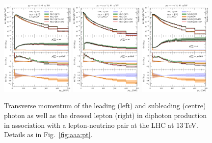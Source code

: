 \begin{figure}[t!]
  \centering
  \includegraphics[width=0.32\textwidth]{figs_aaw/pT_y1}
  \includegraphics[width=0.32\textwidth]{figs_aaw/pT_y2}
  \includegraphics[width=0.32\textwidth]{figs_aaw/pT_l1}
  \caption{
    Transverse momentum of the leading (left) and subleading (centre) 
    photon as well as the dressed lepton (right) in diphoton production 
    in association with a lepton-neutrino pair at the LHC at 13\,TeV. 
    Details as in Fig.\ \ref{fig:aaa:pt}.
    \label{fig:aaw:pt}
  }
\end{figure}

